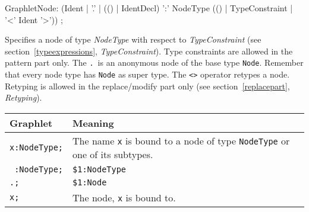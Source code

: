 \begin{rail}
GraphletNode: (Ident | 
    '.' |
    (() | IdentDecl) ':' NodeType (() | TypeConstraint | '<' Ident '>')) ;   
\end{rail}
Specifies a node of type \emph{NodeType} with respect to \emph{TypeConstraint} (see section~\ref{typeexpressions}, \emph{TypeConstraint}). 
Type constraints are allowed in the pattern part only. 
The \texttt{.}\ is an anonymous node of the base type \texttt{Node}. 
Remember that every node type has \texttt{Node} as super type. The \texttt{<>} operator retypes a node. Retyping is allowed in the replace/modify part only (see section~\ref{replacepart}, \emph{Retyping}).
\begin{center}
  \begin{tabularx}{\linewidth}{lX}
    \textbf{Graphlet} & \textbf{Meaning}\\ \hline
    \texttt{x:NodeType;} & The name \texttt{x} is bound to a node of type \texttt{NodeType} or one of its subtypes. \\
    \texttt{ :NodeType;} & \texttt{\$1:NodeType} \\
    \texttt{.;} & \texttt{\$1:Node} \\
    \texttt{x;} & The node, \texttt{x} is bound to.
  \end{tabularx}
\end{center} 

